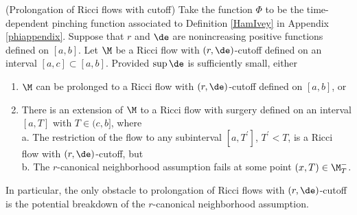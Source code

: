 \begin{lemma}
  \label{lem:kl-performing-surgery-continuing-flows-existence-canonical-neighborhoods}
(Prolongation of Ricci flows with cutoff)
\label{extendit}
Take the function $\Phi$  to be the time-dependent pinching
function  associated to
Definition \ref{HamIvey}
in Appendix \ref{phiappendix}.
Suppose that $r$ and $\de$ are nonincreasing positive functions
defined on $[a,b]$. Let $\M$ be a Ricci flow with
$(r, \de)$-cutoff defined on an interval $[a,c]\subset [a,b]$.
Provided $\sup\de$ is sufficiently small, either
\begin{enumerate}
\item $\M$ can be prolonged to a Ricci flow with
$(r, \de)$-cutoff defined on $[a,b]$, or
\item There is an extension of $\M$ to a Ricci flow with
surgery
defined  on an interval $[a,T]$ with $T \in (c, b]$, where \\
a. The restriction of  the flow to any subinterval $[a, T^\prime]$,
$T^\prime < T$,
is a Ricci flow with $(r, \de)$-cutoff, but\\
b. The $r$-canonical neighborhood assumption fails at some
point $(x,T)\in \M_T^-$.
\end{enumerate}
In particular, the only obstacle to prolongation of Ricci
flows with $(r,\de)$-cutoff is the potential breakdown of the
$r$-canonical neighborhood assumption.
\end{lemma}
